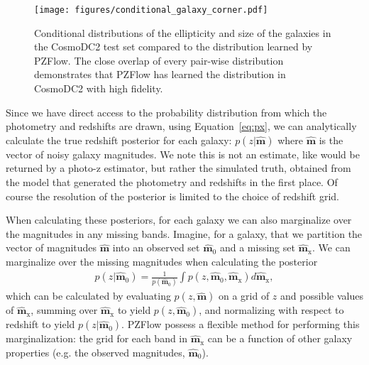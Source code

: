 \documentclass[twocolumn,twocolappendix]{aastex631}
\begin{document}
\begin{figure*}[t]
    \begin{centering}
        \texttt{[image: figures/conditional\_galaxy\_corner.pdf]}
        \caption{
            Conditional distributions of the ellipticity and size of the galaxies in the CosmoDC2 test set compared to the distribution learned by PZFlow.
            The close overlap of every pair-wise distribution demonstrates that PZFlow has learned the distribution in CosmoDC2 with high fidelity.
        }
        \label{fig:conditional-corner}
    \end{centering}
\end{figure*}

Since we have direct access to the probability distribution from which the photometry and redshifts are drawn, using Equation~\ref{eq:px}, we can analytically calculate the true redshift posterior for each galaxy: $p(z|\mathbf{\hat{m}})$ where $\mathbf{\hat{m}}$ is the vector of noisy galaxy magnitudes.
We note this is not an estimate, like would be returned by a photo-z estimator, but rather the simulated truth, obtained from the model that generated the photometry and redshifts in the first place.
Of course the resolution of the posterior is limited to the choice of redshift grid.

When calculating these posteriors, for each galaxy we can also marginalize over the magnitudes in any missing bands.
Imagine, for a galaxy, that we partition the vector of magnitudes $\mathbf{\hat{m}}$ into an observed set $\mathbf{\hat{m}}_0$ and a missing set $\mathbf{\hat{m}}_\text{x}$.
We can marginalize over the missing magnitudes when calculating the posterior
\begin{align}
    p(z|\mathbf{\hat{m}}_0) = \frac{1}{p(\mathbf{\hat{m}}_0)} \int p(z, \mathbf{\hat{m}}_0, \mathbf{\hat{m}}_\text{x}) d\mathbf{\hat{m}}_\text{x},
\end{align}
which can be calculated by evaluating $p(z, \mathbf{\hat{m}})$ on a grid of $z$ and possible values of $\mathbf{\hat{m}}_\text{x}$, summing over $\mathbf{\hat{m}}_\text{x}$ to yield $p(z, \mathbf{\hat{m}}_0)$, and normalizing with respect to redshift to yield $p(z|\mathbf{\hat{m}}_0)$.
PZFlow possess a flexible method for performing this marginalization: the grid for each band in $\mathbf{\hat{m}}_\text{x}$ can be a function of other galaxy properties (e.g. the observed magnitudes, $\mathbf{\hat{m}}_0$).
\end{document}
